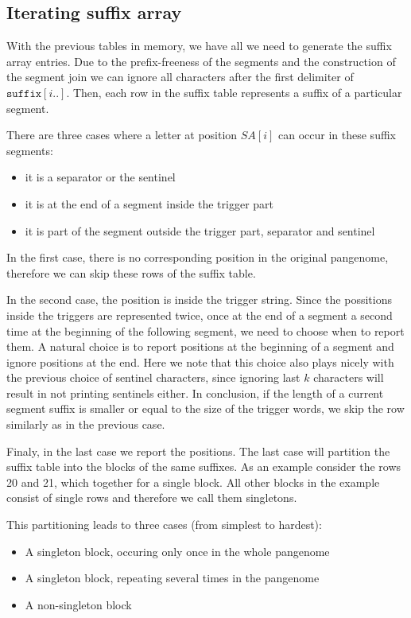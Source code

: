 \documentclass[twocolumn]{ceurart}
\begin{document}


\subsection{Iterating suffix array}
With the previous tables in memory, we have all we need to generate the suffix
array entries.
Due to the prefix-freeness of the segments and the construction of the segment join
we can ignore all characters after the first delimiter of $\texttt{suffix}[i..]$.
Then, each row in the suffix table represents a suffix of a particular segment.

There are three cases where a letter at position $SA[i]$ can occur in these suffix segments:
\begin{itemize}
    \item it is a separator or the sentinel
    \item it is at the end of a segment inside the trigger part
    \item it is part of the segment outside the trigger part, separator and sentinel
\end{itemize}

In the first case, there is no corresponding position in the original pangenome,
therefore we can skip these rows of the suffix table.

In the second case, the position is inside the trigger string.
Since the possitions inside the triggers are represented twice, once at the end
of a segment a second time at the beginning of the following segment, we need
to choose when to report them.
A natural choice is to report positions at the beginning of a segment and ignore
positions at the end.
Here we note that this choice also plays nicely with the previous choice of sentinel
characters, since ignoring last $k$ characters will result in not printing
sentinels either.
In conclusion, if the length of a current segment suffix is smaller or equal to
the size of the trigger words, we skip the row similarly as in the previous case.

Finaly, in the last case we report the positions.
The last case will partition the suffix table into the blocks of the same suffixes.
As an example consider the rows 20 and 21, which together for a single block.
All other blocks in the example consist of single rows and therefore we call them singletons.

This partitioning leads to three cases (from simplest to hardest):
\begin{itemize}
    \item A singleton block, occuring only once in the whole pangenome
    \item A singleton block, repeating several times in the pangenome
    \item A non-singleton block
\end{itemize}
\end{document}
